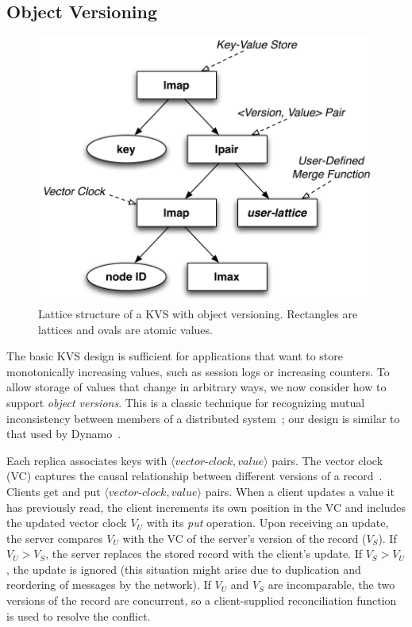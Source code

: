 \subsection{Object Versioning}
\label{sec:kvs-versions}
\begin{figure}[t]
\centering
\includegraphics[width=0.8\linewidth]{fig/kvs-vc-lattice.pdf}
\caption{Lattice structure of a KVS with object versioning. Rectangles are
  lattices and ovals are atomic values.}
\label{fig:kvs-vc-lattices}
\end{figure}

The basic KVS design is sufficient for applications that want to store
monotonically increasing values, such as session logs or increasing counters. To
allow storage of values that change in arbitrary ways, we now consider how to
support \emph{object versions}. This is a classic technique for recognizing
mutual inconsistency between members of a distributed system~\cite{Parker1983};
our design is similar to that used by Dynamo~\cite{DeCandia2007}.

Each replica associates keys with
$\langle\textit{vector-clock},\textit{value}\rangle$ pairs. The vector clock
(VC) captures the causal relationship between different versions of a
record~\cite{Fidge1988,DeCandia2007}. Clients get and put
$\langle\textit{vector-clock},\textit{value}\rangle$ pairs. When a client
updates a value it has previously read, the client increments its own position
in the VC and includes the updated vector clock $V_U$ with its \emph{put}
operation. Upon receiving an update, the server compares $V_U$ with the VC of
the server's version of the record ($V_S$). If $V_U > V_S$, the server replaces
the stored record with the client's update. If $V_S > V_U$, the update is
ignored (this situation might arise due to duplication and reordering of
messages by the network). If $V_U$ and $V_S$ are incomparable, the two versions
of the record are concurrent, so a client-supplied reconciliation function is
used to resolve the conflict.


